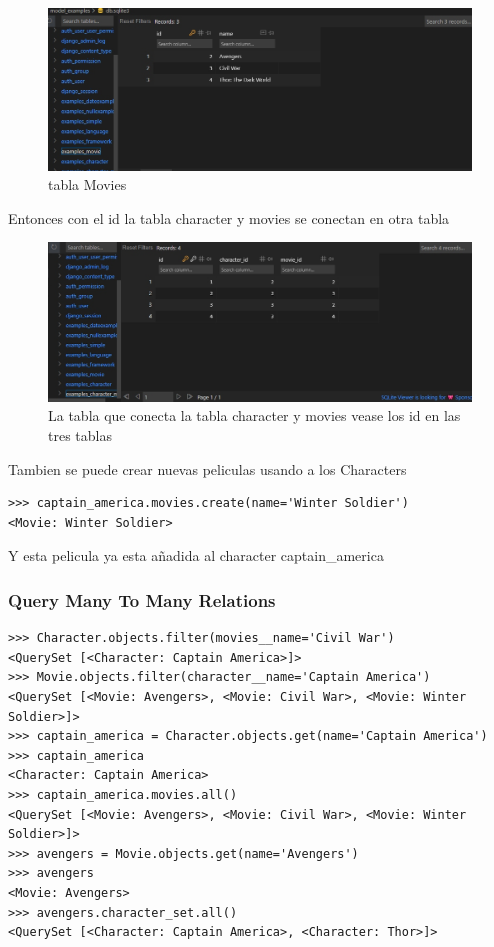 \documentclass{article}
\begin{document}
\begin{figure}[!h]
    \centering
    \includegraphics[scale=1.5]{img/movies.jpg}
    \caption{tabla Movies}
    \label{fig:enter-label}
\end{figure}

\newpage
Entonces con el id la tabla character y movies se conectan en otra tabla

\begin{figure}[!h]
    \centering
    \includegraphics[scale=1.5]{img/5.jpg}
    \caption{La tabla que conecta la tabla character y movies vease los id en las tres tablas}
    \label{fig:enter-label}
\end{figure}

Tambien se puede crear nuevas peliculas usando a los Characters
\begin{lstlisting}
>>> captain_america.movies.create(name='Winter Soldier')
<Movie: Winter Soldier>
\end{lstlisting}
Y esta pelicula ya esta añadida al character captain_america

\subsubsection{Query Many To Many Relations}

\begin{lstlisting}
>>> Character.objects.filter(movies__name='Civil War') 
<QuerySet [<Character: Captain America>]>
>>> Movie.objects.filter(character__name='Captain America') 
<QuerySet [<Movie: Avengers>, <Movie: Civil War>, <Movie: Winter Soldier>]>
>>> captain_america = Character.objects.get(name='Captain America') 
>>> captain_america
<Character: Captain America>
>>> captain_america.movies.all()
<QuerySet [<Movie: Avengers>, <Movie: Civil War>, <Movie: Winter Soldier>]>
>>> avengers = Movie.objects.get(name='Avengers') 
>>> avengers
<Movie: Avengers>
>>> avengers.character_set.all()
<QuerySet [<Character: Captain America>, <Character: Thor>]>
\end{lstlisting}
\end{document}
